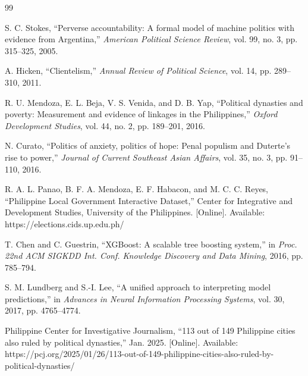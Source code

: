 \documentclass[conference]{IEEEtran}
\begin{document}
\begin{thebibliography}{99}

 S. C. Stokes, ``Perverse accountability: A formal model of machine politics with evidence from Argentina,'' \textit{American Political Science Review}, vol. 99, no. 3, pp. 315--325, 2005.

 A. Hicken, ``Clientelism,'' \textit{Annual Review of Political Science}, vol. 14, pp. 289--310, 2011.

 R. U. Mendoza, E. L. Beja, V. S. Venida, and D. B. Yap, ``Political dynasties and poverty: Measurement and evidence of linkages in the Philippines,'' \textit{Oxford Development Studies}, vol. 44, no. 2, pp. 189--201, 2016.

 N. Curato, ``Politics of anxiety, politics of hope: Penal populism and Duterte's rise to power,'' \textit{Journal of Current Southeast Asian Affairs}, vol. 35, no. 3, pp. 91--110, 2016.

 R. A. L. Panao, B. F. A. Mendoza, E. F. Habacon, and M. C. C. Reyes, ``Philippine Local Government Interactive Dataset,'' Center for Integrative and Development Studies, University of the Philippines. [Online]. Available: https://elections.cids.up.edu.ph/

 T. Chen and C. Guestrin, ``XGBoost: A scalable tree boosting system,'' in \textit{Proc. 22nd ACM SIGKDD Int. Conf. Knowledge Discovery and Data Mining}, 2016, pp. 785--794.

 S. M. Lundberg and S.-I. Lee, ``A unified approach to interpreting model predictions,'' in \textit{Advances in Neural Information Processing Systems}, vol. 30, 2017, pp. 4765--4774.

 Philippine Center for Investigative Journalism, ``113 out of 149 Philippine cities also ruled by political dynasties,'' Jan. 2025. [Online]. Available: https://pcj.org/2025/01/26/113-out-of-149-philippine-cities-also-ruled-by-political-dynasties/

\end{thebibliography}
\end{document}
